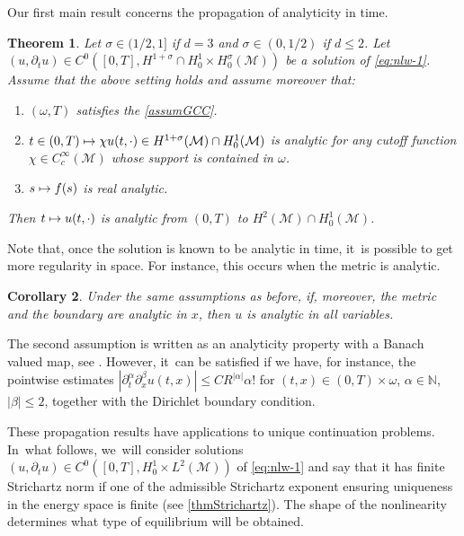\documentclass[JEP,XML,SOM,Unicode,published]{cedram}
\newcommand\mto{\mathchoice{\longmapsto}{\mapsto}{\mapsto}{\mapsto}}
\newtheorem{theorem}{Theorem}[section]
\newtheorem{corollary}[theorem]{Corollary}
\theoremstyle{definition}
\let\mc\mathcal
\newcommand{\M}{\mc{M}}
\newcommand{\N}{\mathbb{N}}
\begin{document}
Our first main result concerns the propagation of analyticity in time.

\begin{theorem}\label{thm:analytic-prop}
Let $\sigma\in (1/2, 1]$ if $d=3$ and $\sigma\in (0,1/2)$ if $d\leq 2$. Let $(u,\partial_t u)\in C^0([0, T], H^{1+\sigma}\cap H^1_0\times H^{\sigma}_0(\M))$ be a solution of \eqref{eq:nlw-1}. Assume that the above setting holds and assume moreover that:
\begin{enumerate}
\item $(\omega, T)$ satisfies the \ref{assumGCC}.
\item $t\in (0, T)\mto \chi u(t,\cdot)\in H^{1+\sigma}(\M)\cap H_0^1(\M)$ is analytic for any cutoff function $\chi\in C_c^\infty(\M)$ whose support is contained in $\omega$.
\item $s\mto f( s)$ is real analytic.
\end{enumerate}
Then $t\mto u(t, \cdot)$ is analytic from $(0, T)$ to $H^{2}(\M)\cap H_0^1(\M)$.
\end{theorem}

Note that, once the solution is known to be analytic in time, it~is possible to get more regularity in space. For instance, this occurs when the metric is analytic.

\begin{corollary}
\label{coranalytspacetime}
Under the same assumptions as before, if, moreover, the metric and the boundary are analytic in $x$, then $u$ is analytic in all variables.
\end{corollary}

The second assumption is written as an analyticity property with a Banach valued map, see \cite[Def.\,5.1]{Muj86}. However, it~can be satisfied if we have, for instance, the pointwise estimates $|\partial_t^{\alpha}\partial_x^{\beta}u(t,x)|\leq CR^{|\alpha|}\alpha!$ for $(t,x)\in (0,T)\times \omega$, $\alpha\in \N$, $|\beta|\leq 2$, together with the Dirichlet boundary condition.

These propagation results have applications to unique continuation problems. In~what follows, we~will consider solutions $(u,\partial_t u)\in C^0([0, T], H^1_0\times L^2(\M))$ of \eqref{eq:nlw-1} and say that it has finite Strichartz norm if one of the admissible Strichartz exponent ensuring uniqueness in the energy space is finite (see \cref{thmStrichartz}). The shape of the nonlinearity determines what type of equilibrium will be obtained.
\end{document}
